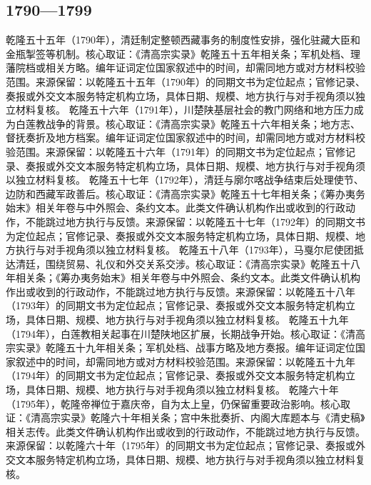 \subsection{1790—1799}
乾隆五十五年（1790年），清廷制定整顿西藏事务的制度性安排，强化驻藏大臣和金瓶掣签等机制。核心取证：《清高宗实录》乾隆五十五年相关条；军机处档、理藩院档或相关方略。编年证词定位国家叙述中的时间，却需同地方或对方材料校验范围。来源保留：以乾隆五十五年（1790年）的同期文书为定位起点；官修记录、奏报或外交文本服务特定机构立场，具体日期、规模、地方执行与对手视角须以独立材料复核。
乾隆五十六年（1791年），川楚陕基层社会的教门网络和地方压力成为白莲教战争的背景。核心取证：《清高宗实录》乾隆五十六年相关条；地方志、督抚奏折及地方档案。编年证词定位国家叙述中的时间，却需同地方或对方材料校验范围。来源保留：以乾隆五十六年（1791年）的同期文书为定位起点；官修记录、奏报或外交文本服务特定机构立场，具体日期、规模、地方执行与对手视角须以独立材料复核。
乾隆五十七年（1792年），清廷与廓尔喀战争结束后处理使节、边防和西藏军政善后。核心取证：《清高宗实录》乾隆五十七年相关条；《筹办夷务始末》相关年卷与中外照会、条约文本。此类文件确认机构作出或收到的行政动作，不能跳过地方执行与反馈。来源保留：以乾隆五十七年（1792年）的同期文书为定位起点；官修记录、奏报或外交文本服务特定机构立场，具体日期、规模、地方执行与对手视角须以独立材料复核。
乾隆五十八年（1793年），马戛尔尼使团抵达清廷，围绕贸易、礼仪和外交关系交涉。核心取证：《清高宗实录》乾隆五十八年相关条；《筹办夷务始末》相关年卷与中外照会、条约文本。此类文件确认机构作出或收到的行政动作，不能跳过地方执行与反馈。来源保留：以乾隆五十八年（1793年）的同期文书为定位起点；官修记录、奏报或外交文本服务特定机构立场，具体日期、规模、地方执行与对手视角须以独立材料复核。
乾隆五十九年（1794年），白莲教相关起事在川楚陕地区扩展，长期战争开始。核心取证：《清高宗实录》乾隆五十九年相关条；军机处档、战事方略及地方奏报。编年证词定位国家叙述中的时间，却需同地方或对方材料校验范围。来源保留：以乾隆五十九年（1794年）的同期文书为定位起点；官修记录、奏报或外交文本服务特定机构立场，具体日期、规模、地方执行与对手视角须以独立材料复核。
乾隆六十年（1795年），乾隆帝禅位于嘉庆帝，自为太上皇，仍保留重要政治影响。核心取证：《清高宗实录》乾隆六十年相关条；宫中朱批奏折、内阁大库题本与《清史稿》相关志传。此类文件确认机构作出或收到的行政动作，不能跳过地方执行与反馈。来源保留：以乾隆六十年（1795年）的同期文书为定位起点；官修记录、奏报或外交文本服务特定机构立场，具体日期、规模、地方执行与对手视角须以独立材料复核。
